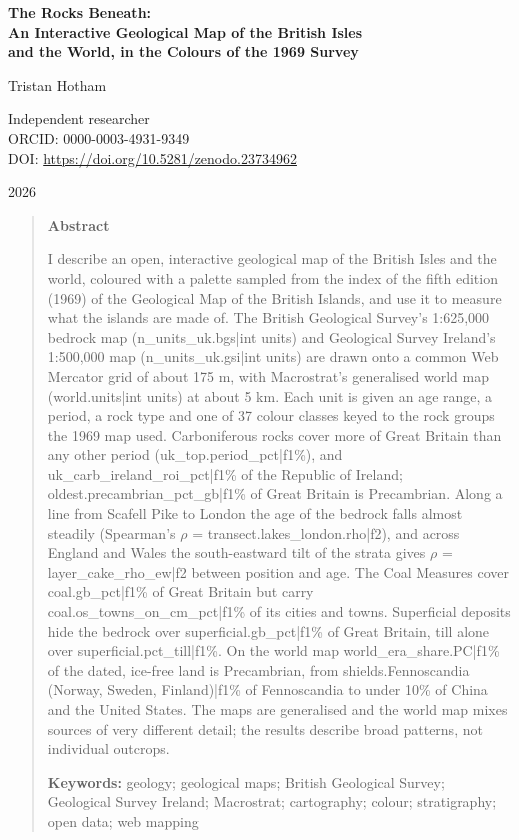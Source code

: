 \documentclass[11pt,a4paper]{article}
\begin{document}
\begin{center}
{\Large\bfseries The Rocks Beneath:\\[2pt] An Interactive Geological Map of the British Isles\\[2pt] and the World, in the Colours of the 1969 Survey\par}
\vspace{1.2em}
{\large Tristan Hotham\par}
\vspace{0.3em}
{\small Independent researcher\\
ORCID: 0000-0003-4931-9349\\
DOI: \href{https://doi.org/10.5281/zenodo.23734962}{https://doi.org/10.5281/zenodo.23734962}\par}
\vspace{0.8em}
2026
\end{center}

\begin{quote}
\small
\begin{center}\textbf{Abstract}\end{center}
I describe an open, interactive geological map of the British Isles and the world, coloured with a palette sampled from the index of the fifth edition (1969) of the Geological Map of the British Islands, and use it to measure what the islands are made of. The British Geological Survey's 1:625,000 bedrock map ({{n_units_uk.bgs|int}} units) and Geological Survey Ireland's 1:500,000 map ({{n_units_uk.gsi|int}} units) are drawn onto a common Web Mercator grid of about 175 m, with Macrostrat's generalised world map ({{world.units|int}} units) at about 5 km. Each unit is given an age range, a period, a rock type and one of 37 colour classes keyed to the rock groups the 1969 map used. Carboniferous rocks cover more of Great Britain than any other period ({{uk_top.period_pct|f1}}\%), and {{uk_carb_ireland_roi_pct|f1}}\% of the Republic of Ireland; {{oldest.precambrian_pct_gb|f1}}\% of Great Britain is Precambrian. Along a line from Scafell Pike to London the age of the bedrock falls almost steadily (Spearman's $\rho$ = {{transect.lakes_london.rho|f2}}), and across England and Wales the south-eastward tilt of the strata gives $\rho$ = {{layer_cake_rho_ew|f2}} between position and age. The Coal Measures cover {{coal.gb_pct|f1}}\% of Great Britain but carry {{coal.os_towns_on_cm_pct|f1}}\% of its cities and towns. Superficial deposits hide the bedrock over {{superficial.gb_pct|f1}}\% of Great Britain, till alone over {{superficial.pct_till|f1}}\%. On the world map {{world_era_share.PC|f1}}\% of the dated, ice-free land is Precambrian, from {{shields.Fennoscandia (Norway, Sweden, Finland)|f1}}\% of Fennoscandia to under 10\% of China and the United States. The maps are generalised and the world map mixes sources of very different detail; the results describe broad patterns, not individual outcrops.

\textbf{Keywords:} geology; geological maps; British Geological Survey; Geological Survey Ireland; Macrostrat; cartography; colour; stratigraphy; open data; web mapping
\end{quote}
\end{document}
